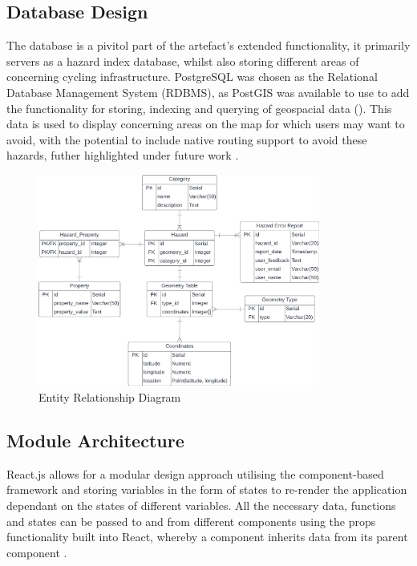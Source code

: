 \subsection{Database Design}
\label{system:database-design}

The database is a pivitol part of the artefact's extended functionality, it primarily servers as a hazard index database, whilst also storing different areas of concerning cycling infrastructure. PostgreSQL was chosen as the Relational Database Management System (RDBMS), as PostGIS was available to use to add the functionality for storing, indexing and querying of geospacial data (\cite{noauthor_postgis_nodate}). This data is used to display concerning areas on the map for which users may want to avoid, with the potential to include native routing support to avoid these hazards, futher highlighted under future work  . 

\begin{figure}[!ht]
  \centering
  \includegraphics[width=350px]{figures/erd.png}
  \caption{Entity Relationship Diagram}
  \label{fig:erd}
\end{figure}

\subsection{Module Architecture}
\label{system:module-architecture}
React.js allows for a modular design approach utilising the component-based framework and storing variables in the form of states to re-render the application dependant on the states of different variables. All the necessary data, functions and states can be passed to and from different components using the props functionality built into React, whereby a component inherits data from its parent component .  

